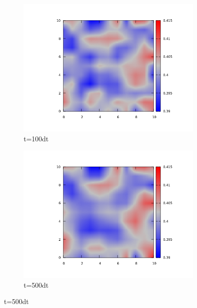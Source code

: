 \documentclass{article}
\begin{document}
\begin{figure}
\centering
\begin{subfigure}{.5\textwidth}
  \centering
  \includegraphics[width=1.0\linewidth]{100per.png}
  \caption{t=100dt}
  \label{fig:sub1}
\end{subfigure}%
\begin{subfigure}{.5\textwidth}
  \centering
  \includegraphics[width=1.0\linewidth]{500per.png}
  \caption{t=500dt}
  \label{fig:sub2}
\end{subfigure}
\label{fig:test}
\end{figure}
\vfill
\end{document}
